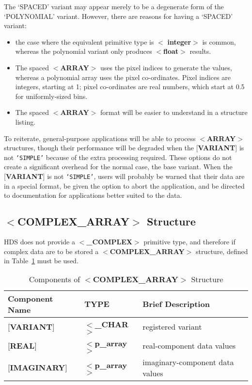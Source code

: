 The `SPACED' variant may appear merely
to be a degenerate form of the `POLYNOMIAL' variant.  However, there are reasons for
having a `SPACED' variant:
\begin{itemize}
\item the case where the equivalent primitive type is $<${\bf
integer}$>$ is common, whereas the polynomial variant only produces
$<${\bf float}$>$ results. 
\item The spaced $<${\bf ARRAY}$>$ uses the pixel indices
to generate the values, whereas a
polynomial array uses the pixel co-ordinates.  Pixel
indices are integers, starting at 1; pixel
co-ordinates are real numbers, which start at 0.5
for uniformly-sized bins.
\item The spaced $<${\bf ARRAY}$>$ format will be easier to understand
in a structure listing. 
\end{itemize}

To reiterate, general-purpose applications will be able to process
\mbox{$<${\bf ARRAY}$>$} structures, though their performance will be
degraded when the {[}{\bf VARIANT}{]} is not {\tt `SIMPLE'} because of
the extra processing required. These options do not create a significant
overhead for the normal case, the base variant.
When the {[}{\bf VARIANT}{]} is not {\tt `SIMPLE'},
users will probably be warned that their data are in a special format,
be given the option to abort the application, and be directed to
documentation for applications better suited to the data. 

\subsection{$<${\bf COMPLEX\_ARRAY}$>$ Structure\label{se:scomplex}}

HDS does not provide a $<${\bf \_COMPLEX}$>$ primitive type, and
therefore if complex data are to be stored a $<${\bf COMPLEX\_ARRAY}$>$
structure, defined in Table~\ref{ta:complex} must be used.

\begin{table}[htb]
\centering
\caption{Components of $<${\bf COMPLEX\_ARRAY}$>$ Structure}
\label{ta:complex}
\begin{tabular}{|l|l|l|}
\hline
Component Name & TYPE & Brief Description \\ \hline
{[}{\bf VARIANT}{]} & $<${\bf \_CHAR}$>$ & registered variant \\
{[}{\bf REAL}{]} & $<${\bf p\_array}$>$ & real-component data values  \\
{[}{\bf IMAGINARY}{]} & $<${\bf p\_array}$>$ & imaginary-component data values \\ \hline
\end{tabular}
\end{table}

